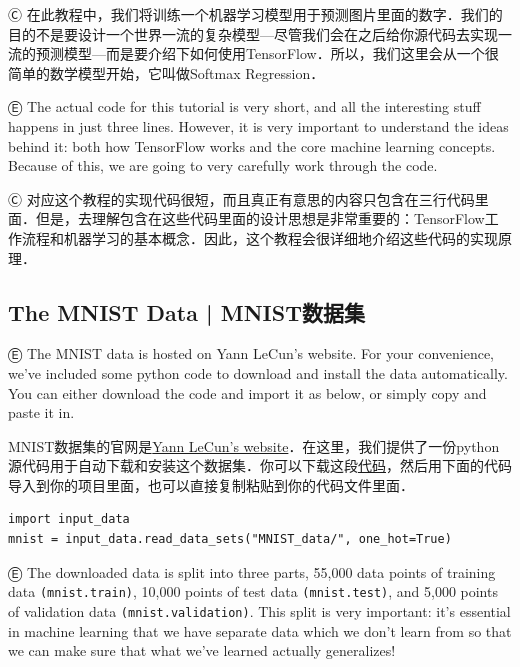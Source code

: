 Ⓒ 在此教程中，我们将训练一个机器学习模型用于预测图片里面的数字．我们的目的不是要设计一个世界一流的复杂模型---尽管我们会在之后给你源代码去实现一流的预测模型---而是要介绍下如何使用TensorFlow．所以，我们这里会从一个很简单的数学模型开始，它叫做Softmax Regression．

Ⓔ \textcolor{etc}{The actual code for this tutorial is very short, and all the interesting stuff happens in just three lines. However, it is very important to understand the ideas behind it: both how TensorFlow works and the core machine learning concepts. Because of this, we are going to very carefully work through the code.}

Ⓒ 对应这个教程的实现代码很短，而且真正有意思的内容只包含在三行代码里面．但是，去理解包含在这些代码里面的设计思想是非常重要的：TensorFlow工作流程和机器学习的基本概念．因此，这个教程会很详细地介绍这些代码的实现原理．

\subsection {The MNIST Data  |  MNIST数据集}

Ⓔ \textcolor{etc}{The MNIST data is hosted on Yann LeCun's website. For your convenience, we've included some python code to download and install the data automatically. You can either download the code and import it as below, or simply copy and paste it in.}

MNIST数据集的官网是\href{http://yann.lecun.com/exdb/mnist/}{Yann LeCun's website}．在这里，我们提供了一份python源代码用于自动下载和安装这个数据集．你可以下载这段\href{https://tensorflow.googlesource.com/tensorflow/+/master/tensorflow/examples/tutorials/mnist/input_data.py}{代码}，然后用下面的代码导入到你的项目里面，也可以直接复制粘贴到你的代码文件里面．

\begin{lstlisting}
import input_data
mnist = input_data.read_data_sets("MNIST_data/", one_hot=True)
\end{lstlisting}

Ⓔ \textcolor{etc}{The downloaded data is split into three parts, 55,000 data points of training data \lstinline{(mnist.train)}, 10,000 points of test data \lstinline{(mnist.test)}, and 5,000 points of validation data \lstinline{(mnist.validation)}. This split is very important: it's essential in machine learning that we have separate data which we don't learn from so that we can make sure that what we've learned actually generalizes!}

